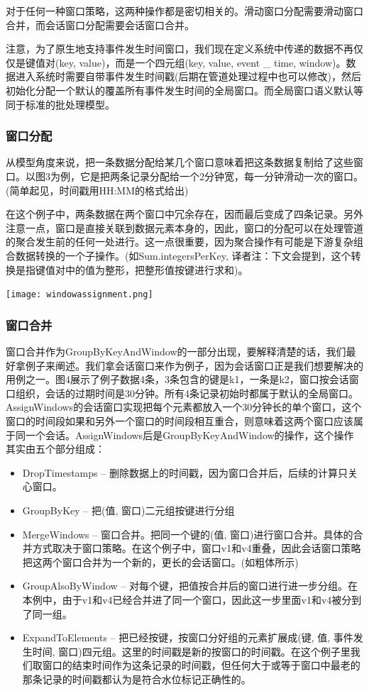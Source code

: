 \documentclass[oneside]{ctexbook}
\begin{document}
对于任何一种窗口策略，这两种操作都是密切相关的。滑动窗口分配需要滑动窗口合并，而会话窗口分配需要会话窗口合并。

注意，为了原生地支持事件发生时间窗口，我们现在定义系统中传递的数据不再仅仅是键值对(key, value)，而是一个四元组(key, value, event \_ time, window)。数据进入系统时需要自带事件发生时间戳(后期在管道处理过程中也可以修改)，然后初始化分配一个默认的覆盖所有事件发生时间的全局窗口。而全局窗口语义默认等同于标准的批处理模型。

\subsubsection{窗口分配}

从模型角度来说，把一条数据分配给某几个窗口意味着把这条数据复制给了这些窗口。以图3为例，它是把两条记录分配给一个2分钟宽，每一分钟滑动一次的窗口。(简单起见，时间戳用HH:MM的格式给出)

在这个例子中，两条数据在两个窗口中冗余存在，因而最后变成了四条记录。另外注意一点，窗口是直接关联到数据元素本身的，因此，窗口的分配可以在处理管道的聚合发生前的任何一处进行。这一点很重要，因为聚合操作有可能是下游复杂组合数据转换的一个子操作。(如Sum.integersPerKey, 译者注：下文会提到，这个转换是指键值对中的值为整形，把整形值按键进行求和)。

\noindent \texttt{[image: windowassignment.png]}

\subsubsection{窗口合并}

窗口合并作为GroupByKeyAndWindow的一部分出现，要解释清楚的话，我们最好拿例子来阐述。我们拿会话窗口来作为例子，因为会话窗口正是我们想要解决的用例之一。图4展示了例子数据4条，3条包含的键是k1，一条是k2，窗口按会话窗口组织，会话的过期时间是30分钟。所有4条记录初始时都属于默认的全局窗口。AssignWindows的会话窗口实现把每个元素都放入一个30分钟长的单个窗口，这个窗口的时间段如果和另外一个窗口的时间段相互重合，则意味着这两个窗口应该属于同一个会话。AssignWindows后是GroupByKeyAndWindow的操作，这个操作其实由五个部分组成：

\begin{itemize}
\item DropTimestamps – 删除数据上的时间戳，因为窗口合并后，后续的计算只关心窗口。
\item GroupByKey – 把(值, 窗口)二元组按键进行分组
\item MergeWindows – 窗口合并。把同一个键的(值, 窗口)进行窗口合并。具体的合并方式取决于窗口策略。在这个例子中，窗口v1和v4重叠，因此会话窗口策略把这两个窗口合并为一个新的，更长的会话窗口。(如粗体所示)
\item GroupAlsoByWindow – 对每个键，把值按合并后的窗口进行进一步分组。在本例中，由于v1和v4已经合并进了同一个窗口，因此这一步里面v1和v4被分到了同一组。
\item ExpandToElements – 把已经按键，按窗口分好组的元素扩展成(键, 值, 事件发生时间, 窗口)四元组。这里的时间戳是新的按窗口的时间戳。在这个例子里我们取窗口的结束时间作为这条记录的时间戳，但任何大于或等于窗口中最老的那条记录的时间戳都认为是符合水位标记正确性的。
\end{itemize}
\end{document}
